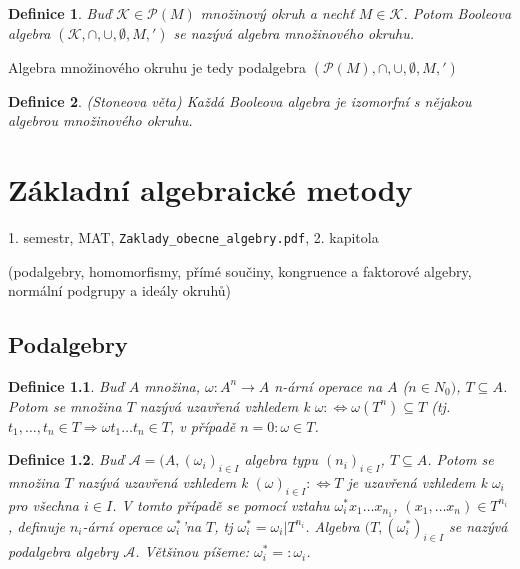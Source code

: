 \documentclass[a4paper, 11pt]{report}
\newtheorem{mydef}{Definice}[chapter]
\begin{document}
\begin{mydef}
Buď $\mathcal{K} \in \mathcal{P}(M)$ množinový okruh a nechť $M \in \mathcal{K}$. Potom Booleova algebra $(\mathcal{K}, \cap, \cup, \emptyset, M, ')$ se nazývá algebra množinového okruhu.
\end{mydef}

Algebra množinového okruhu je tedy podalgebra $(\mathcal{P}(M), \cap, \cup, \emptyset, M, ')$

\begin{mydef}
(Stoneova věta) Každá Booleova algebra je izomorfní s nějakou algebrou množinového okruhu.
\end{mydef}

















\chapter{Základní algebraické metody} \label{cha:9}

1. semestr, MAT, \texttt{Zaklady\_obecne\_algebry.pdf}, 2. kapitola

(podalgebry, homomorfismy, přímé součiny, kongruence a faktorové algebry, normální podgrupy a ideály okruhů)

\section{Podalgebry}

\begin{mydef}
Buď $A$ množina, $\omega: A^n \to A$ n-ární operace na $A$ ($n \in N_0)$, $T \subseteq A$. Potom se množina $T$ nazývá uzavřená vzhledem k $\omega: \Leftrightarrow \omega(T^n) \subseteq T$ (tj. $t_1, \dots, t_n \in T \Rightarrow \omega t_1 \dots t_n \in T$, v případě $n = 0: \omega \in T$.
\end{mydef}

\begin{mydef}
Buď $\mathcal{A} = (A, (\omega_i)_{i \in I}$ algebra typu $(n_i)_{i \in I}$, $T \subseteq A$. Potom se množina $T$ nazývá uzavřená vzhledem k $(\omega)_{i \in I}: \Leftrightarrow T$ je uzavřená vzhledem k $\omega_i$ pro všechna $i \in I$. V tomto případě se pomocí vztahu $\omega_i^*x_1 \dots x_{n_1}$, $(x_1, \dots x_n) \in T^{n_i}$, definuje $n_i$-ární operace $\omega_i^*$'na $T$, tj $\omega_i^* = \omega_i|T^{n_i}$. Algebra $(T, (\omega_i^*)_{i \in I}$ se nazývá podalgebra algebry $\mathcal{A}$. Většinou píšeme: $\omega_i^* =: \omega_i$.
\end{mydef}
\end{document}
